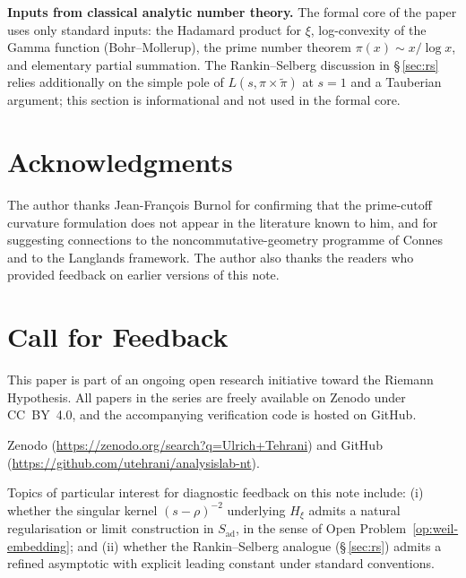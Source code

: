 \documentclass[11pt]{article}
\newcommand{\Hxi}{H_{\xi}}
\newcommand{\Sad}{S_{\mathrm{ad}}}
\begin{document}
\textbf{Inputs from classical analytic number theory.}
The formal core of the paper uses only standard inputs:
the Hadamard product for $\xi$, log-convexity of the Gamma
function (Bohr--Mollerup), the prime number theorem
$\pi(x)\sim x/\log x$, and elementary partial summation.
The Rankin--Selberg discussion in \S\,\ref{sec:rs} relies
additionally on the simple pole of
$L(s,\pi\times\widetilde{\pi})$ at $s=1$ and a Tauberian
argument; this section is informational and not used in the
formal core.

\section*{Acknowledgments}

The author thanks Jean-Fran\c{c}ois Burnol for confirming
that the prime-cutoff curvature formulation does not appear
in the literature known to him, and for suggesting connections
to the noncommutative-geometry programme of Connes and to the
Langlands framework.
The author also thanks the readers who provided feedback on
earlier versions of this note.

\section*{Call for Feedback}

This paper is part of an ongoing open research initiative
toward the Riemann Hypothesis.
All papers in the series are freely available on Zenodo under
CC~BY~4.0, and the accompanying verification code is hosted
on GitHub.

{\sloppy
Zenodo (\url{https://zenodo.org/search?q=Ulrich+Tehrani})
and GitHub
(\url{https://github.com/utehrani/analysislab-nt}).
\par}

Topics of particular interest for diagnostic feedback on this
note include:
(i) whether the singular kernel $(s-\rho)^{-2}$ underlying
$\Hxi$ admits a natural regularisation or limit construction
in $\Sad$, in the sense of
Open Problem~\ref{op:weil-embedding}; and
(ii) whether the Rankin--Selberg analogue
(\S\,\ref{sec:rs}) admits a refined asymptotic with explicit
leading constant under standard conventions.
\end{document}
